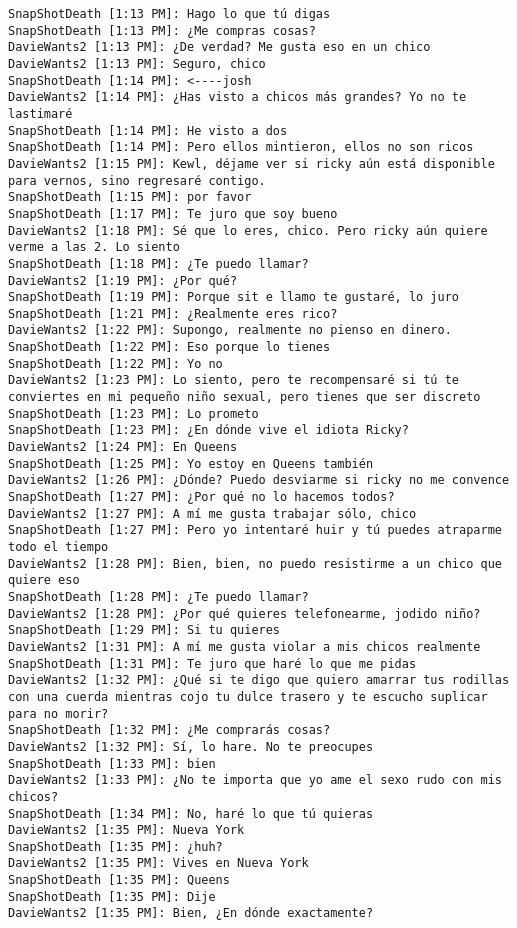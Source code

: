 \begin{verbatim}
SnapShotDeath [1:13 PM]: Hago lo que tú digas 
SnapShotDeath [1:13 PM]: ¿Me compras cosas? 
DavieWants2 [1:13 PM]: ¿De verdad? Me gusta eso en un chico 
DavieWants2 [1:13 PM]: Seguro, chico 
SnapShotDeath [1:14 PM]: <----josh 
DavieWants2 [1:14 PM]: ¿Has visto a chicos más grandes? Yo no te lastimaré 
SnapShotDeath [1:14 PM]: He visto a dos 
SnapShotDeath [1:14 PM]: Pero ellos mintieron, ellos no son ricos 
DavieWants2 [1:15 PM]: Kewl, déjame ver si ricky aún está disponible para vernos, sino regresaré contigo. 
SnapShotDeath [1:15 PM]: por favor 
SnapShotDeath [1:17 PM]: Te juro que soy bueno 
DavieWants2 [1:18 PM]: Sé que lo eres, chico. Pero ricky aún quiere verme a las 2. Lo siento 
SnapShotDeath [1:18 PM]: ¿Te puedo llamar? 
DavieWants2 [1:19 PM]: ¿Por qué? 
SnapShotDeath [1:19 PM]: Porque sit e llamo te gustaré, lo juro 
SnapShotDeath [1:21 PM]: ¿Realmente eres rico? 
DavieWants2 [1:22 PM]: Supongo, realmente no pienso en dinero. 
SnapShotDeath [1:22 PM]: Eso porque lo tienes 
SnapShotDeath [1:22 PM]: Yo no 
DavieWants2 [1:23 PM]: Lo siento, pero te recompensaré si tú te conviertes en mi pequeño niño sexual, pero tienes que ser discreto 
SnapShotDeath [1:23 PM]: Lo prometo 
SnapShotDeath [1:23 PM]: ¿En dónde vive el idiota Ricky? 
DavieWants2 [1:24 PM]: En Queens
SnapShotDeath [1:25 PM]: Yo estoy en Queens también
DavieWants2 [1:26 PM]: ¿Dónde? Puedo desviarme si ricky no me convence 
SnapShotDeath [1:27 PM]: ¿Por qué no lo hacemos todos? 
DavieWants2 [1:27 PM]: A mí me gusta trabajar sólo, chico 
SnapShotDeath [1:27 PM]: Pero yo intentaré huir y tú puedes atraparme todo el tiempo 
DavieWants2 [1:28 PM]: Bien, bien, no puedo resistirme a un chico que quiere eso 
SnapShotDeath [1:28 PM]: ¿Te puedo llamar? 
DavieWants2 [1:28 PM]: ¿Por qué quieres telefonearme, jodido niño? 
SnapShotDeath [1:29 PM]: Si tu quieres 
DavieWants2 [1:31 PM]: A mí me gusta violar a mis chicos realmente 
SnapShotDeath [1:31 PM]: Te juro que haré lo que me pidas 
DavieWants2 [1:32 PM]: ¿Qué si te digo que quiero amarrar tus rodillas con una cuerda mientras cojo tu dulce trasero y te escucho suplicar para no morir? 
SnapShotDeath [1:32 PM]: ¿Me comprarás cosas? 
DavieWants2 [1:32 PM]: Sí, lo hare. No te preocupes 
SnapShotDeath [1:33 PM]: bien 
DavieWants2 [1:33 PM]: ¿No te importa que yo ame el sexo rudo con mis chicos? 
SnapShotDeath [1:34 PM]: No, haré lo que tú quieras
DavieWants2 [1:35 PM]: Nueva York 
SnapShotDeath [1:35 PM]: ¿huh? 
DavieWants2 [1:35 PM]: Vives en Nueva York 
SnapShotDeath [1:35 PM]: Queens 
SnapShotDeath [1:35 PM]: Dije 
DavieWants2 [1:35 PM]: Bien, ¿En dónde exactamente? 

\end{verbatim}
